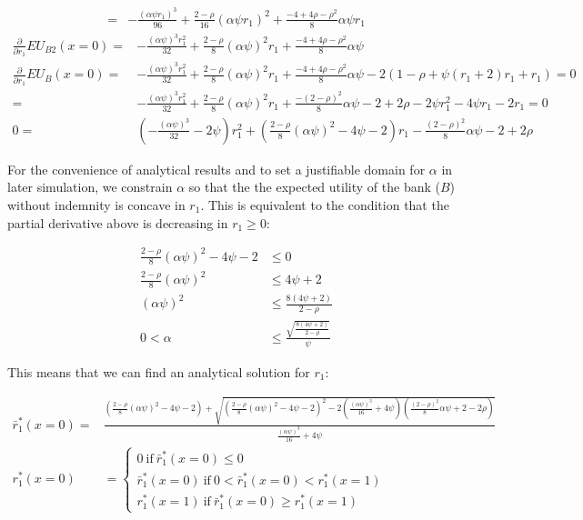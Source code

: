 \documentclass[
  a4paper,
  abstract=true]{scrartcl}
\theoremstyle{definition}
\begin{document}
\begin{align*}
=&-\frac{(\alpha\psi r_1)^3}{96}+\frac{2-\rho}{16}(\alpha\psi r_1)^2+\frac{-4+4\rho-\rho^2}{8}\alpha\psi r_1
\end{align*} \begin{align*}
\frac{\partial}{\partial r_1}EU_{B2}(x=0)=&-\frac{(\alpha\psi )^3r_1^2}{32}+\frac{2-\rho}{8}(\alpha\psi)^2r_1+\frac{-4+4\rho-\rho^2}{8}\alpha\psi \\
\frac{\partial}{\partial r_1}EU_{B}(x=0)=&-\frac{(\alpha\psi )^3r_1^2}{32}+\frac{2-\rho}{8}(\alpha\psi)^2r_1+\frac{-4+4\rho-\rho^2}{8}\alpha\psi-2(1-\rho+\psi(r_1+2)r_1+r_1)=0\\
=&-\frac{(\alpha\psi )^3r_1^2}{32}+\frac{2-\rho}{8}(\alpha\psi)^2r_1+\frac{-(2-\rho)^2}{8}\alpha\psi-2+2\rho-2\psi r_1^2-4\psi r_1-2r_1=0\\
0=&(-\frac{(\alpha\psi )^3}{32}-2\psi)r_1^2+(\frac{2-\rho}{8}(\alpha\psi)^2-4\psi-2)r_1-\frac{(2-\rho)^2}{8}\alpha\psi-2+2\rho
\end{align*}

For the convenience of analytical results and to set a justifiable
domain for \(\alpha\) in later simulation, we constrain \(\alpha\) so
that the the expected utility of the bank (\(B\)) without indemnity is
concave in \(r_1\). This is equivalent to the condition that the partial
derivative above is decreasing in \(r_1\geq0\):

\begin{align*}
\frac{2-\rho}{8}(\alpha\psi)^2-4\psi-2&\leq0\\
\frac{2-\rho}{8}(\alpha\psi)^2&\leq4\psi+2\\
(\alpha\psi)^2&\leq\frac{8(4\psi+2)}{2-\rho}\\
0<\alpha&\leq\frac{\sqrt{\frac{8(4\psi+2)}{2-\rho}}}{\psi}
\end{align*}

This means that we can find an analytical solution for \(r_1\):

\begin{align*}
\bar r_1^*(x=0)=&\frac{(\frac{2-\rho}{8}(\alpha\psi)^2-4\psi-2)+\sqrt{(\frac{2-\rho}{8}(\alpha\psi)^2-4\psi-2)^2-2(\frac{(\alpha\psi)^3}{16}+4\psi)(\frac{(2-\rho)^2}{8}\alpha\psi+2-2\rho)}}{\frac{(\alpha\psi)^3}{16}+4\psi} \\
r_1^*(x=0)&=\begin{cases}
0~\text{if}~\bar r_1^*(x=0)\leq0\\
\bar r_1^*(x=0)~\text{if}~0<\bar r_1^*(x=0)<r_1^*(x=1) \\
r_1^*(x=1)~\text{if}~\bar r_1^*(x=0)\geq r_1^*(x=1)
\end{cases}
\end{align*}
\end{document}
